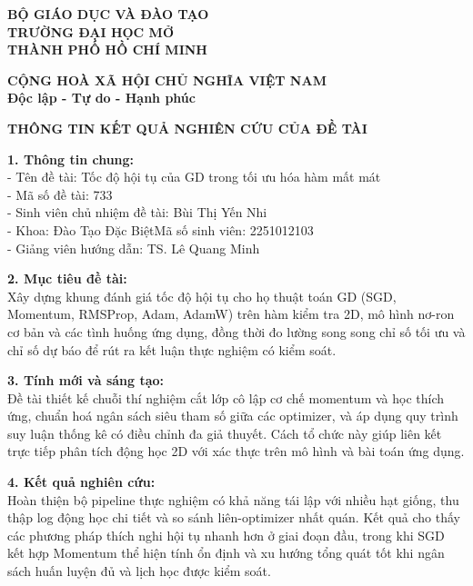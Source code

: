 \documentclass[a4paper,12pt]{article}
\newcommand{\ReportTitle}{Tốc độ hội tụ của GD trong tối ưu hóa hàm mất mát}
\newcommand{\ProjectCode}{733}
\newcommand{\ChairName}{Bùi Thị Yến Nhi}
\newcommand{\AdvisorName}{TS. Lê Quang Minh}
\newcommand{\FacultyName}{Đào Tạo Đặc Biệt}
\newcommand{\StudentId}{2251012103}
\begin{document}
\begin{titlepage}
\thispagestyle{empty}
\begin{minipage}[t]{0.48\textwidth}
\centering
{\large \textbf{BỘ GIÁO DỤC VÀ ĐÀO TẠO}}\\[0.2cm]
{\large \textbf{TRƯỜNG ĐẠI HỌC MỞ}}\\[0.1cm]
{\large \textbf{THÀNH PHỐ HỒ CHÍ MINH}}
\end{minipage}
\hfill
\begin{minipage}[t]{0.48\textwidth}
\centering
{\large \textbf{CỘNG HOÀ XÃ HỘI CHỦ NGHĨA VIỆT NAM}}\\[0.2cm]
{\large \textbf{Độc lập - Tự do - Hạnh phúc}}
\end{minipage}

\vspace{1.2cm}
\begin{center}
{\Large \textbf{THÔNG TIN KẾT QUẢ NGHIÊN CỨU CỦA ĐỀ TÀI}}
\end{center}

\vspace{0.6cm}
\noindent\textbf{1. Thông tin chung:}\\
- Tên đề tài: \ReportTitle\\
- Mã số đề tài: \ProjectCode\\
- Sinh viên chủ nhiệm đề tài: \ChairName\\
- Khoa: \FacultyName \hfill Mã số sinh viên: \StudentId\\
- Giảng viên hướng dẫn: \AdvisorName

\vspace{0.45cm}
\noindent\textbf{2. Mục tiêu đề tài:}\\
Xây dựng khung đánh giá tốc độ hội tụ cho họ thuật toán GD (SGD, Momentum, RMSProp, Adam, AdamW) trên hàm kiểm tra 2D, mô hình nơ-ron cơ bản và các tình huống ứng dụng, đồng thời đo lường song song chỉ số tối ưu và chỉ số dự báo để rút ra kết luận thực nghiệm có kiểm soát.

\vspace{0.45cm}
\noindent\textbf{3. Tính mới và sáng tạo:}\\
Đề tài thiết kế chuỗi thí nghiệm cắt lớp cô lập cơ chế momentum và học thích ứng, chuẩn hoá ngân sách siêu tham số giữa các optimizer, và áp dụng quy trình suy luận thống kê có điều chỉnh đa giả thuyết. Cách tổ chức này giúp liên kết trực tiếp phân tích động học 2D với xác thực trên mô hình và bài toán ứng dụng.

\vspace{0.45cm}
\noindent\textbf{4. Kết quả nghiên cứu:}\\
Hoàn thiện bộ pipeline thực nghiệm có khả năng tái lập với nhiều hạt giống, thu thập log động học chi tiết và so sánh liên-optimizer nhất quán. Kết quả cho thấy các phương pháp thích nghi hội tụ nhanh hơn ở giai đoạn đầu, trong khi SGD kết hợp Momentum thể hiện tính ổn định và xu hướng tổng quát tốt khi ngân sách huấn luyện đủ và lịch học được kiểm soát.


\end{titlepage}
\end{document}
